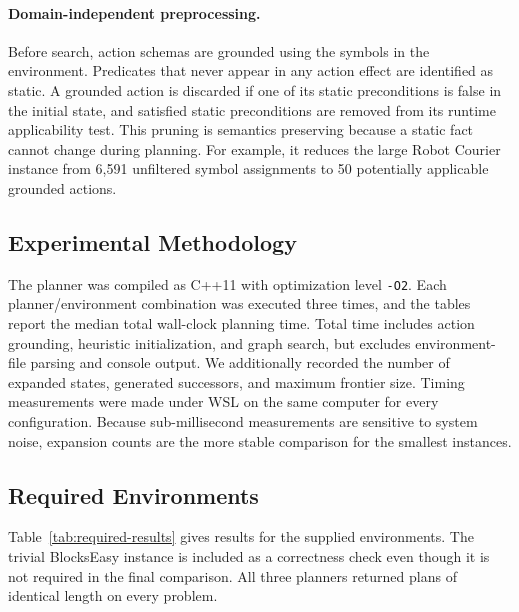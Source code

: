 \paragraph{Domain-independent preprocessing.}
Before search, action schemas are grounded using the symbols in the environment.
Predicates that never appear in any action effect are identified as static.  A
grounded action is discarded if one of its static preconditions is false in the
initial state, and satisfied static preconditions are removed from its runtime
applicability test.  This pruning is semantics preserving because a static fact
cannot change during planning.  For example, it reduces the large Robot Courier
instance from 6,591 unfiltered symbol assignments to 50 potentially applicable
grounded actions.

\subsection{Experimental Methodology}

The planner was compiled as C++11 with optimization level \texttt{-O2}.  Each
planner/environment combination was executed three times, and the tables report
the median total wall-clock planning time.  Total time includes action grounding,
heuristic initialization, and graph search, but excludes environment-file parsing
and console output.  We additionally recorded the number of expanded states,
generated successors, and maximum frontier size.  Timing measurements were made
under WSL on the same computer for every configuration.  Because sub-millisecond
measurements are sensitive to system noise, expansion counts are the more stable
comparison for the smallest instances.

\subsection{Required Environments}

Table~\ref{tab:required-results} gives results for the supplied environments.
The trivial BlocksEasy instance is included as a correctness check even though
it is not required in the final comparison.  All three planners returned plans
of identical length on every problem.


